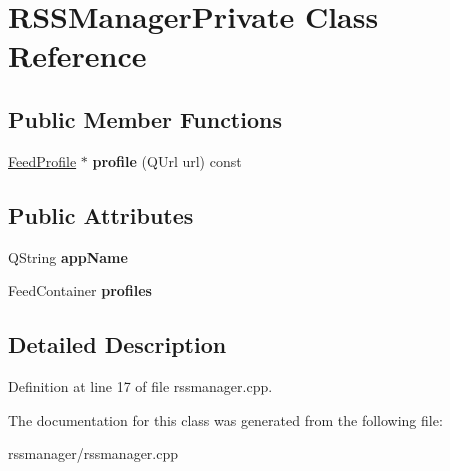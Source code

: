 \hypertarget{class_r_s_s_manager_private}{\section{R\-S\-S\-Manager\-Private Class Reference}
\label{class_r_s_s_manager_private}
}
\subsection*{Public Member Functions}
\begin{DoxyCompactItemize}
\item 
\hypertarget{class_r_s_s_manager_private_adc74973568e4d98885b4a9bfee400e01}{\hyperlink{class_feed_profile}{Feed\-Profile} $\ast$ {\bfseries profile} (Q\-Url url) const }\label{class_r_s_s_manager_private_adc74973568e4d98885b4a9bfee400e01}

\end{DoxyCompactItemize}
\subsection*{Public Attributes}
\begin{DoxyCompactItemize}
\item 
\hypertarget{class_r_s_s_manager_private_ace6f9ff6472e7058e88cc26e85462b30}{Q\-String {\bfseries app\-Name}}\label{class_r_s_s_manager_private_ace6f9ff6472e7058e88cc26e85462b30}

\item 
\hypertarget{class_r_s_s_manager_private_af1c098185c0f943919018b56bfe30748}{Feed\-Container {\bfseries profiles}}\label{class_r_s_s_manager_private_af1c098185c0f943919018b56bfe30748}

\end{DoxyCompactItemize}


\subsection{Detailed Description}


Definition at line 17 of file rssmanager.\-cpp.



The documentation for this class was generated from the following file\-:\begin{DoxyCompactItemize}
\item 
rssmanager/rssmanager.\-cpp\end{DoxyCompactItemize}
